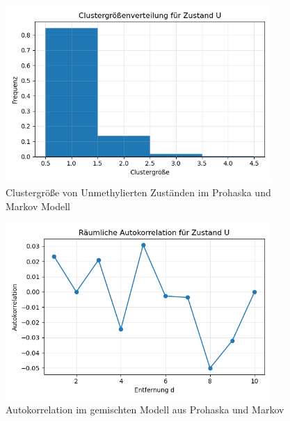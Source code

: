 \documentclass{SeminarV2}
\begin{document}
\begin{figure} [htbp]
  \centering
  \includegraphics[width=0.9\textwidth]{images/Histone_Prohaska_and_Markov_1000_cluster.png}
  \caption{Clustergröße von Unmethylierten Zuständen im Prohaska und Markov Modell}
  \label{fig:PM_1000_C}
  \end{figure}

\begin{figure}
  \centering
  \includegraphics[width=0.9\textwidth]{images/Histone_Prohaska_and_Markov_1000_Autokorrelation.png}
  \caption{Autokorrelation im gemischten Modell aus Prohaska und Markov}
  \label{fig:PM_1000_A}
\end{figure}

\newpage

\begin{footnotesize}


\end{footnotesize}
\end{document}
